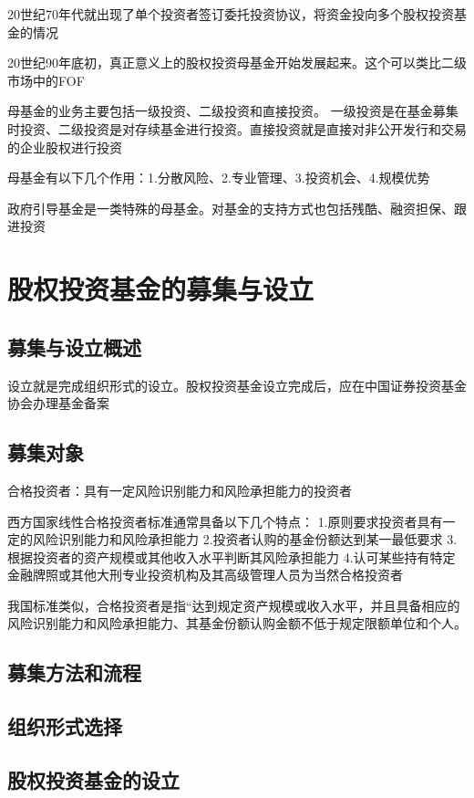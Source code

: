 \documentclass[UTF8,12pt]{ctexbook}
\numberwithin{equation}{section} %
\numberwithin{figure}{section}
\numberwithin{table}{section}
\begin{document}
	20世纪70年代就出现了单个投资者签订委托投资协议，将资金投向多个股权投资基金的情况
	
	20世纪90年底初，真正意义上的股权投资母基金开始发展起来。这个可以类比二级市场中的FOF
	
	母基金的业务主要包括一级投资、二级投资和直接投资。
	一级投资是在基金募集时投资、二级投资是对存续基金进行投资。直接投资就是直接对非公开发行和交易的企业股权进行投资
	
	
	母基金有以下几个作用：1.分散风险、2.专业管理、3.投资机会、4.规模优势
	
	政府引导基金是一类特殊的母基金。对基金的支持方式也包括残酷、融资担保、跟进投资
	
	\section{股权投资基金的募集与设立}
	\subsection{募集与设立概述}
	
	设立就是完成组织形式的设立。股权投资基金设立完成后，应在中国证券投资基金协会办理基金备案
	
	\subsection{募集对象}
	合格投资者：具有一定风险识别能力和风险承担能力的投资者
	
	西方国家线性合格投资者标准通常具备以下几个特点：
	1.原则要求投资者具有一定的风险识别能力和风险承担能力
	2.投资者认购的基金份额达到某一最低要求
	3.根据投资者的资产规模或其他收入水平判断其风险承担能力
	4.认可某些持有特定金融牌照或其他大刑专业投资机构及其高级管理人员为当然合格投资者
	
	我国标准类似，合格投资者是指“达到规定资产规模或收入水平，并且具备相应的风险识别能力和风险承担能力、其基金份额认购金额不低于规定限额单位和个人。
	
	\subsection{募集方法和流程}
	
	\subsection{组织形式选择}
	
	\subsection{股权投资基金的设立}
	
\end{document}
